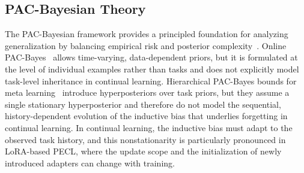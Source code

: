 \documentclass{article}
\theoremstyle{plain}
\theoremstyle{definition}
\theoremstyle{remark}
\begin{document}


\subsection{PAC-Bayesian Theory }

The PAC-Bayesian framework provides a principled foundation for analyzing generalization by balancing empirical risk and posterior complexity~\cite{mcallesterPACBayesianStochasticModel2003,pentinaPACBayesianBoundLifelong2014,germainPACBayesianTheoryMeets2016,lotfiPACBayesCompressionBounds2022}.
Online PAC-Bayes~\citep{NEURIPS2022_onlineBayes,NEURIPS2024_xinrui} allows time-varying, data-dependent priors, but it is formulated at the level of individual examples rather than tasks and does not explicitly model task-level inheritance in continual learning.
Hierarchical PAC-Bayes bounds for meta learning~\citep{pentinaPACBayesianBoundLifelong2014,JMLR:v24:22-1254} introduce hyperposteriors over task priors, but they assume a single stationary hyperposterior and therefore do not model the sequential, history-dependent evolution of the inductive bias that underlies forgetting in continual learning.
In continual learning, the inductive bias must adapt to the observed task history, and this nonstationarity is particularly pronounced in LoRA-based PECL, where the update scope and the initialization of newly introduced adapters can change with training.
\end{document}
